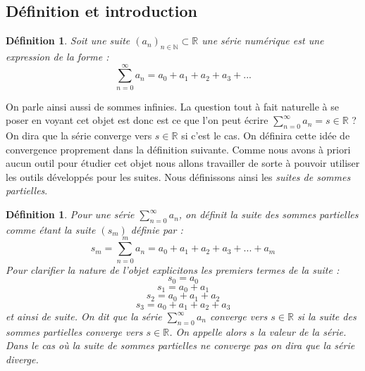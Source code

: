 \documentclass[a4paper, 12pt, french, twoside]{article}
\newtheorem{defi}[theorem]{Définition}
\newcommand{\Nn}{{\mathbb{N}}}
\newcommand{\Rr}{{\mathbb{R}}}
\begin{document}
\subsection{Définition et introduction}
\begin{defi}
    Soit une suite $(a_n)_{n \in \Nn } \subset \Rr$ une série numérique est une expression de la forme : 
    $$ \sum_{n=0}^{\infty} a_n = a_0 + a_1 + a_2 + a_3 + ... $$
 \end{defi}    
On parle ainsi aussi de sommes infinies. La question tout à fait naturelle à se poser en voyant cet objet est donc est ce que l'on peut écrire $\sum_{n=0}^{\infty} a_n = s \in \Rr $ ? On dira que la série converge vers $s \in \Rr$ si c'est le cas. On définira cette idée de convergence proprement dans la définition suivante.
\newline 
Comme nous avons à priori aucun outil pour étudier cet objet nous allons travailler de sorte à pouvoir utiliser les outils développés pour les suites. Nous définissons ainsi les \textit{suites de sommes partielles}. 
\begin{defi}
    Pour une série  $ \sum_{n=0}^{\infty} a_n$, on définit la suite des sommes partielles comme étant la suite $(s_m)$ définie par : $$ s_m = \sum_{n=0}^m  a_n = a_0 + a_1 + a_2 + a_3 + ... + a_m $$
    Pour clarifier la nature de l'objet explicitons les premiers termes de la suite :
    $$ s_0 = a_0$$
    $$ s_1 = a_0 + a_1$$
    $$ s_2 = a_0 + a_1 + a_2$$
    $$ s_3 = a_0 + a_1 + a_2 + a_3$$
    et ainsi de suite.
    On dit que la série  $ \sum_{n=0}^{\infty} a_n$ converge vers  $ s\in \Rr$ si la suite des sommes partielles converge vers $s \in \Rr$. On appelle alors $s$ la valeur de la série. Dans le cas où la suite de sommes partielles ne converge pas on dira que la série diverge. 
\end{defi}
\end{document}
